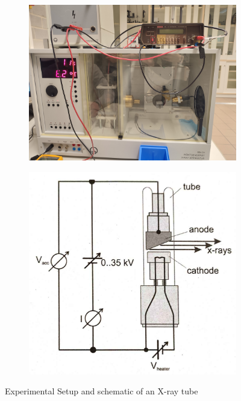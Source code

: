 \documentclass{scrartcl}
\begin{document}
\begin{figure}
    \centering
    \begin{subfigure}{0.4\textwidth}
    \includegraphics[width=\textwidth]{1647529200496.jpg}
    \label{fig:test2}
    \end{subfigure}
    \hfill
    \begin{subfigure}{0.4\textwidth}
    \includegraphics[width=\textwidth]{x_ray_2.jpg}
    \label{fig:test1}
    \end{subfigure}
    \caption{Experimental Setup and schematic of an X-ray tube}
\end{figure}
\end{document}
